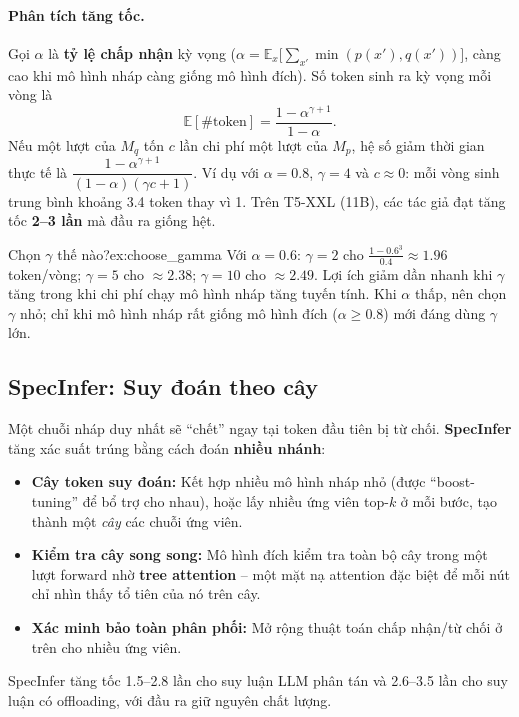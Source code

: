 \paragraph{Phân tích tăng tốc.} Gọi $\alpha$ là \textbf{tỷ lệ chấp nhận} kỳ vọng ($\alpha = \mathbb{E}_x\big[\sum_{x'}\min(p(x'), q(x'))\big]$, càng cao khi mô hình nháp càng giống mô hình đích). Số token sinh ra kỳ vọng mỗi vòng là
\[
\mathbb{E}[\#\text{token}] = \frac{1 - \alpha^{\gamma+1}}{1 - \alpha}.
\]
Nếu một lượt của $M_q$ tốn $c$ lần chi phí một lượt của $M_p$, hệ số giảm thời gian thực tế là $\dfrac{1 - \alpha^{\gamma+1}}{(1-\alpha)(\gamma c + 1)}$. Ví dụ với $\alpha = 0.8$, $\gamma = 4$ và $c \approx 0$: mỗi vòng sinh trung bình khoảng 3.4 token thay vì 1. Trên T5-XXL (11B), các tác giả đạt tăng tốc \textbf{2--3 lần} mà đầu ra giống hệt.

\begin{example}{Chọn $\gamma$ thế nào?}{ex:choose_gamma}
Với $\alpha = 0.6$: $\gamma = 2$ cho $\frac{1-0.6^3}{0.4} \approx 1.96$ token/vòng; $\gamma = 5$ cho $\approx 2.38$; $\gamma = 10$ cho $\approx 2.49$. Lợi ích giảm dần nhanh khi $\gamma$ tăng trong khi chi phí chạy mô hình nháp tăng tuyến tính. Khi $\alpha$ thấp, nên chọn $\gamma$ nhỏ; chỉ khi mô hình nháp rất giống mô hình đích ($\alpha \geq 0.8$) mới đáng dùng $\gamma$ lớn.
\end{example}

\subsection{SpecInfer: Suy đoán theo cây}
\label{ssec:specinfer}
Một chuỗi nháp duy nhất sẽ “chết” ngay tại token đầu tiên bị từ chối. \textbf{SpecInfer} \cite{miao2024specinfer} tăng xác suất trúng bằng cách đoán \textbf{nhiều nhánh}:
\begin{itemize}
	\item \textbf{Cây token suy đoán:} Kết hợp nhiều mô hình nháp nhỏ (được “boost-tuning” để bổ trợ cho nhau), hoặc lấy nhiều ứng viên top-$k$ ở mỗi bước, tạo thành một \emph{cây} các chuỗi ứng viên.
	\item \textbf{Kiểm tra cây song song:} Mô hình đích kiểm tra toàn bộ cây trong một lượt forward nhờ \textbf{tree attention} -- một mặt nạ attention đặc biệt để mỗi nút chỉ nhìn thấy tổ tiên của nó trên cây.
	\item \textbf{Xác minh bảo toàn phân phối:} Mở rộng thuật toán chấp nhận/từ chối ở trên cho nhiều ứng viên.
\end{itemize}
SpecInfer tăng tốc 1.5--2.8 lần cho suy luận LLM phân tán và 2.6--3.5 lần cho suy luận có offloading, với đầu ra giữ nguyên chất lượng.

